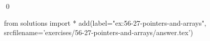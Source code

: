 
\begin{ex}
  \label{ex:56-27-pointers-and-arrays}
  
  \qed
\end{ex}
\begin{python0}
from solutions import *
add(label="ex:56-27-pointers-and-arrays",
    srcfilename='exercises/56-27-pointers-and-arrays/answer.tex')
\end{python0}
